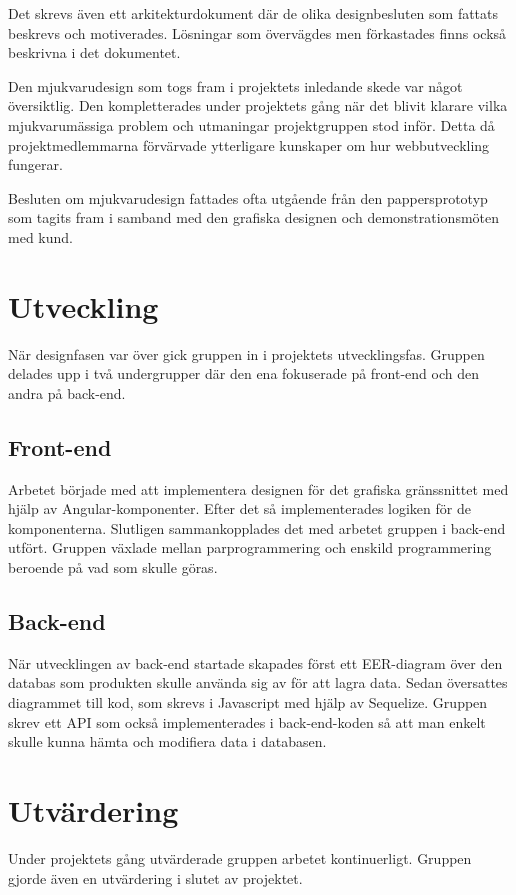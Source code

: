 Det skrevs även ett arkitekturdokument där de olika designbesluten som fattats beskrevs och motiverades. Lösningar som övervägdes men förkastades finns också beskrivna i det dokumentet.

Den mjukvarudesign som togs fram i projektets inledande skede var något översiktlig. Den kompletterades under projektets gång när det blivit klarare vilka mjukvarumässiga problem och utmaningar projektgruppen stod inför. Detta då projektmedlemmarna förvärvade ytterligare kunskaper om hur webbutveckling fungerar. 

Besluten om mjukvarudesign fattades ofta utgående från den pappersprototyp som tagits fram i samband med den grafiska designen och demonstrationsmöten med kund.

\section{Utveckling}
När designfasen var över gick gruppen in i projektets utvecklingsfas. Gruppen delades upp i två undergrupper där den ena fokuserade på front-end och den andra på back-end.

\subsection{Front-end}
Arbetet började med att implementera designen för det grafiska gränssnittet med hjälp av Angular-komponenter. Efter det så implementerades logiken för de komponenterna. Slutligen sammankopplades det med arbetet gruppen i back-end utfört. Gruppen växlade mellan parprogrammering och enskild programmering beroende på vad som skulle göras.       

\subsection{Back-end}
När utvecklingen av back-end startade skapades först ett EER-diagram över den databas som produkten skulle använda sig av för att lagra data. 
Sedan översattes diagrammet till kod, som skrevs i Javascript med hjälp av Sequelize. 
Gruppen skrev ett API som också implementerades i back-end-koden så att man enkelt skulle kunna hämta och modifiera data i databasen.

\section{Utvärdering}
Under projektets gång utvärderade gruppen arbetet kontinuerligt. Gruppen gjorde även en utvärdering i slutet av projektet.

